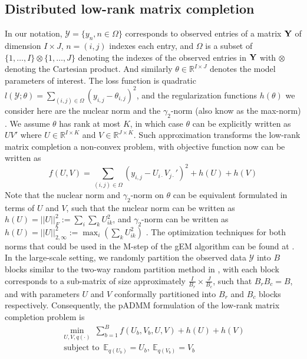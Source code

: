 \documentclass{article}
\DeclareMathOperator*{\st}{subject~to}
\newcommand{\Ymat}[0]{\ensuremath{{\bf Y}}\xspace}
\newcommand{\1}[0]{\ensuremath{\boldsymbol{1}}\xspace}
\begin{document}
\subsection{Distributed low-rank matrix completion}
In our notation, $\mathcal{Y} = \{y_n, n\in\Omega\}$ corresponds to observed entries of a matrix $\Ymat$ of dimension $I \times J$, $n = (i,j)$ indexes each entry, and $\Omega$ is a subset of $\{1, \ldots, I\}\otimes\{1,\ldots, J\}$ denoting the indexes of the observed entries in $\Ymat$ with $\otimes$ denoting the Cartesian product. And similarly $\theta \in \mathbb{R}^{I\times J}$ denotes the model parameters of interest. The loss function is quadratic $l(\mathcal{Y}; \theta) = \sum_{(i,j)\in\Omega}(y_{i,j} - \theta_{i,j})^2$, and the regularization functions $h(\theta)$ we consider here are the nuclear norm and the $\gamma_2$-norm (also know as the max-norm) \cite{Srebro2004}. We assume $\theta$ has rank at most $K$, in which case $\theta$ can be explicitly written as $UV'$ where $U \in \mathbb{R}^{I\times K}$ and $V \in \mathbb{R}^{J \times K}$. Such approximation transforms the low-rank matrix completion a non-convex problem, with objective function now can be written as
\begin{equation}\label{mf_obj}
\textstyle f(U,V) = \sum_{(i,j)\in\Omega}(y_{i,j} - U_{i\cdot}V_{j\cdot}')^2 + h(U) + h(V)
\end{equation}
Note that the nuclear norm and $\gamma_2$-norm on $\theta$ can be equivalent formulated in terms of $U$ and $V$, such that the nuclear norm can be written as $h(U) = ||U||_F^2 := \sum_{i}\sum_kU_{ik}^2$, and $\gamma_2$-norm can be written as $h(U) = ||U||_{2,\infty}^2 := \max_i(\sum_k U_{ik}^2)$ \cite{Recht2010}. The optimization techniques for both norms that could be used in the M-step of the gEM algorithm can be found at \cite{Salakhutdinov2007, Lee2010}. In the large-scale setting, we randomly partition the observed data $\mathcal{Y}$ into $B$ blocks similar to the two-way random partition method in \cite{Recht2011}, with each block corresponds to a sub-matrix of size approximately $\frac{I}{B_r} \times \frac{J}{B_c}$, such that $B_rB_c = B$, and with parameters $U$ and $V$ conformally partitioned into $B_r$ and $B_c$ blocks respectively. Consequently, the pADMM formulation of the low-rank matrix completion problem is
\begin{equation}\label{mf_padmm}
\begin{gathered}
\textstyle \min_{U,V, q(\cdot)}~ \sum_{b=1}^B f(U_b,V_b, U, V) + h(U) + h(V)\\
\st ~ \mathbb{E}_{q(U_b)} = U_b, ~ \mathbb{E}_{q(V_b)} = V_b \\
\end{gathered}
\end{equation}
\end{document}
